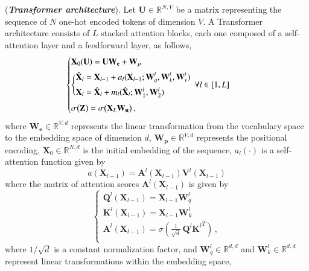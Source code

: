 %
\begin{definition}
\label{def-transformer-model}
%
(\textbf{\emph{Transformer architecture}}).
%
%
Let $\bm{U} \in \mathbb{R}^{N,V}$ be a matrix representing the sequence of $N$ one-hot encoded tokens of dimension $V$.
%
A Transformer architecture consists of $L$ stacked attention blocks, each one composed of a self-attention layer and a feedforward layer, as follows,
%
\begin{equation}
\label{eq:def:transformer-model}
\begin{cases}
%
\bm{X}_0(\bm{U}) = \bm{U} \bm{W_e} + \bm{W}_p \\[5pt]
\vspace{5pt}
\begin{aligned}
\Bigg\{
\begin{aligned}
&\hat{\bm{X}}_l = \bm{X}_{l-1} + a_l(\bm{X}_{l-1}; \bm{W}_q^l, \bm{W}_k^l, \bm{W}_v^l) \\[2pt]
&\bm{X}_l = \hat{\bm{X}}_l + m_l(\hat{\bm{X}}_l ; \bm{W}_1^l, \bm{W}_2^l)
\end{aligned} & \,\,\, \forall l \in [1, L] 
\end{aligned} \\
\sigma\big(\bm{Z}\big) = \sigma\big(\bm{X}_L \bm{W_u}\big) \,,
%
\end{cases}
\end{equation}
%
where $\bm{W_e}\in \mathbb{R}^{V,d}$ represents the linear transformation from the vocabulary space to the embedding space of dimension $d$, $\bm{W_p}\in \mathbb{R}^{V,d}$ represents the positional encoding,  $\bm{X}_0\in \mathbb{R}^{N,d}$ is the initial embedding of the sequence, 
$a_l(\cdot)$ is a self-attention function given by 
%
\begin{equation}
    a(\bm{X}_{l-1}) = \bm{A}^l(\bm{X}_{l-1})\bm{V}^l(\bm{X}_{l-1})
\end{equation}
%
where the matrix of attention scores $\bm{A}^l(\bm{X}_{l-1})$ is given by 
%
\begin{equation}
\label{eq:results:self-attention-transformers}
\begin{cases}
%
\bm{Q}^l(\bm{X}_{l-1}) = \bm{X}_{l-1}\bm{W}^l_q \\
\bm{K}^l(\bm{X}_{l-1}) = \bm{X}_{l-1}\bm{W}^l_k \\
\bm{A}^l(\bm{X}_{l-1}) = \sigma\left(\frac{1}{\sqrt{d}}\,\bm{Q}^l {\bm{K}^l}^T\right) \,,\\
%
\end{cases}
\end{equation}
%
where $1/\sqrt{d}$ is a constant normalization factor, and $\bm{W}_q^l\in \mathbb{R}^{d,d}$ and $\bm{W}^l_k\in \mathbb{R}^{d,d}$ represent linear transformations within the embedding space,

\end{definition}
